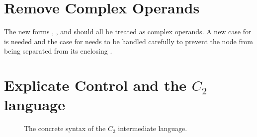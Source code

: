 \documentclass[11pt]{book}
\newcommand{\gray}[1]{{\color{gray} #1}}
\begin{document}
\section{Remove Complex Operands}
\label{sec:remove-complex-opera-R3}

The new forms , , and 
should all be treated as complex operands. A new case for
 is needed and the case for  needs to be
handled carefully to prevent the  node from being separated
from its enclosing .


\section{Explicate Control and the $C_2$ language}
\label{sec:explicate-control-r3}

\begin{figure}[tbp]
\fbox{
\begin{minipage}{0.96\textwidth}
\small    
\[
\begin{array}{lcl}
\Atm &::=& \gray{ \Int \mid \Var \mid \itm{bool} } \\
\itm{cmp} &::= & \gray{ \key{eq?} \mid \key{<} } \\
\Exp &::=& \gray{ \Atm \mid \key{(read)} \mid \key{(-}~\Atm\key{)} \mid \key{(+}~\Atm~\Atm\key{)} } \\
  &\mid& \gray{ \LP \key{not}~\Atm \RP \mid \LP \itm{cmp}~\Atm~\Atm\RP } \\
&\mid& \LP \key{allocate}~\Int~\Type \RP \\
  &\mid& (\key{vector-ref}\;\Atm\;\Int) \mid (\key{vector-set!}\;\Atm\;\Int\;\Atm)\\
  &\mid& \LP \key{global-value}~\Var \RP \mid \LP \key{void} \RP \\
\Stmt &::=& \gray{ \Var~\key{=}~\Exp\key{;} } \mid \LP\key{collect}~\Int \RP\\
\Tail &::= & \gray{ \key{return}~\Exp\key{;} \mid \Stmt~\Tail } 
   \mid \gray{ \key{goto}~\itm{label}\key{;} }\\
   &\mid& \gray{ \key{if}~\LP \itm{cmp}~\Atm~\Atm \RP~ \key{goto}~\itm{label}\key{;} ~\key{else}~\key{goto}~\itm{label}\key{;} } \\
C_2 & ::= & \gray{ (\itm{label}\key{:}~ \Tail)\ldots }
\end{array}
\]
\end{minipage}
}
\caption{The concrete syntax of the $C_2$ intermediate language.}
\label{fig:c2-concrete-syntax}
\end{figure}
\end{document}
